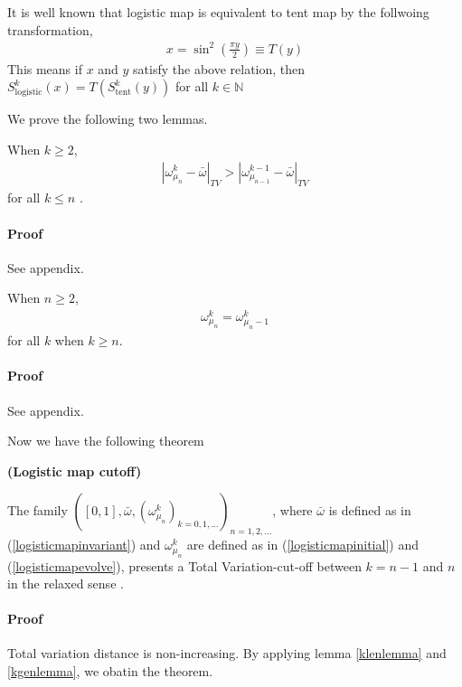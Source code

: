 It is well known that logistic map is equivalent to tent map by the follwoing transformation,
\begin{eqnarray} 
\label{tltransformation}
  x = \sin^2 \left(\frac{\pi y}{2}\right) \equiv T(y)
\end{eqnarray}
This means if $x$ and $y$ satisfy the above relation, then $S_\text{logistic}^k(x) = T(S_\text{tent}^k(y))$ for all $k \in \mathbb{N}$


We prove the following two lemmas.
\begin{lemma}
\label{klenlemma}
When $k \ge 2$,
  \begin{eqnarray} 
     |\omega_{\mu_n}^k - \bar{\omega}|_{TV}>|\omega_{\mu_{n-1}}^{k-1} - \bar{\omega}|_{TV}
  \end{eqnarray}
for all $k \le n$ .
\end{lemma}
\paragraph{Proof} See appendix.


\begin{lemma}
\label{kgenlemma}
When $n \ge 2$,
  \begin{eqnarray}
     \omega_{\mu_n}^k = \omega_{\mu_n-1}^{k}
  \end{eqnarray}
for all $k$ when $k \ge n$.
\end{lemma}
\paragraph{Proof} See appendix.



Now we have the following theorem
\begin{theorem} {\bfseries (Logistic map cutoff)}

The family $([0,1],\bar{\omega}, (\omega^k_{\mu_n})_{k=0,1,...})_{n=1,2,...}$, where $\bar{\omega}$ is defined as in (\ref{logisticmapinvariant}) and $\omega^k_{\mu_n}$ are defined as in (\ref{logisticmapinitial}) and (\ref{logisticmapevolve}), presents a Total Variation-cut-off between $k=n-1$ and $n$ in the relaxed sense .
\end{theorem}

\paragraph{Proof}
Total variation distance is non-increasing. By applying lemma \ref{klenlemma} and \ref{kgenlemma}, we obatin the theorem. 




